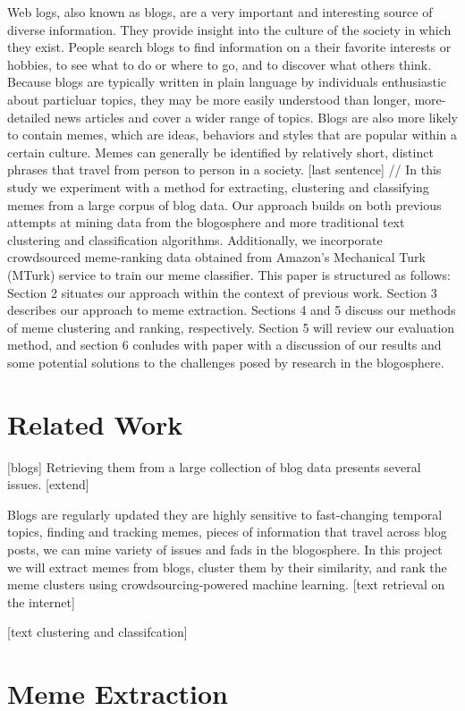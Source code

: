 \documentclass{sig-alternate}
\begin{document}
Web logs, also known as blogs, are a very important and interesting source of diverse information. They provide insight into the culture of the society in which they exist. People search blogs to find information on a their favorite interests or hobbies, to see what to do or where to go, and to discover what others think. Because blogs are typically written in plain language by individuals enthusiastic about particluar topics, they may be more easily understood than longer, more-detailed news articles and cover a wider range of topics. Blogs are also more likely to contain memes, which are ideas, behaviors and styles that are popular within a certain culture. Memes can generally be identified by relatively short, distinct phrases that travel from person to person in a society. [last sentence]   
//   In this study we experiment with a method for extracting, clustering and classifying memes from a large corpus of blog data.  Our approach builds on both previous attempts at mining data from the blogosphere and more traditional text clustering and classification algorithms.  Additionally, we incorporate crowdsourced meme-ranking data obtained from Amazon's Mechanical Turk (MTurk) service to train our meme classifier.  This paper is structured as follows: Section 2 situates our approach within the context of previous work.  Section 3 describes our approach to meme extraction.  Sections 4 and 5 discuss our methods of meme clustering and ranking, respectively.  Section 5 will review our evaluation method, and section 6 conludes with paper with a discussion of our results and some potential solutions to the challenges posed by research in the blogosphere.  

\section{Related Work}
[blogs]
Retrieving them from a large collection of blog data presents several issues. [extend] 

Blogs are regularly updated they are highly sensitive to fast-changing temporal topics, finding and tracking memes, pieces of information that travel across blog posts, we can mine variety of issues and fads in the blogosphere. In this project we will extract memes from blogs, cluster them by their similarity, and rank the meme clusters using crowdsourcing-powered machine learning.
[text retrieval on the internet]

[text clustering and classifcation]

\section{Meme Extraction}
\end{document}

